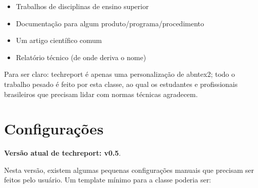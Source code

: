 \documentclass{techreport}
\newcommand{\trep}{\textsf{techreport}}
\begin{document}
\begin{itemize}
\item Trabalhos de disciplinas de ensino superior
\item Documentação para algum produto/programa/procedimento
\item Um artigo científico comum
\item Relatório técnico (de onde deriva o nome)
\end{itemize}

Para ser claro: \trep{} é apenas uma personalização de \textsf{abntex2}; todo o trabalho pesado é feito por esta classe, ao qual os estudantes e profissionais brasileiros que precisam lidar com normas técnicas agradecem.

\section{Configurações}
\label{sec:configuracoes}

\textbf{Versão atual de techreport: v0.5}.

Nesta versão, existem algumas pequenas configurações manuais que precisam ser feitos pelo usuário. Um template mínimo para a classe poderia ser:
\end{document}
